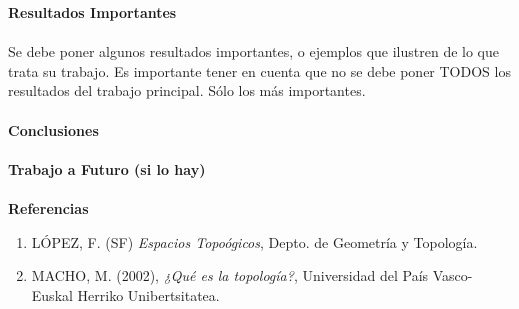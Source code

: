 \documentclass[12pt, oneside]{article}
\begin{document}
\textbf{Resultados Importantes} \\
\\
Se debe poner algunos resultados importantes, o ejemplos que ilustren de lo que trata su trabajo. Es importante tener en cuenta que no se debe poner TODOS los resultados del trabajo principal. Sólo los más importantes.
\\ \\
\lipsum[3]
\vspace{1cm}
\textbf{Conclusiones}
\\ \\
\lipsum[4]
\vspace{1cm}
\textbf{Trabajo a Futuro (si lo hay)}
\\ \\
\lipsum[4]
\vspace{1cm}
\textbf{Referencias} %
\begin{enumerate}
\item LÓPEZ, F. (SF) \textit{Espacios Topoógicos}, Depto. de Geometría y Topología.
\item MACHO, M. (2002), \textit{¿Qué es la topología?}, Universidad del País Vasco-Euskal Herriko Unibertsitatea.
\end{enumerate}
\vspace{1cm}
\noindent{}
\\ \\ \\
\end{document}
